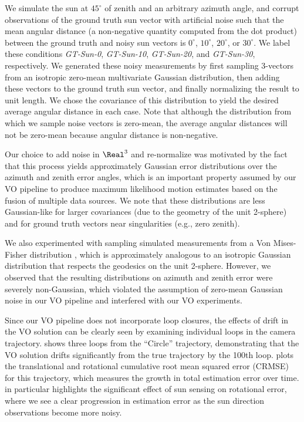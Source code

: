 We simulate the sun at $45^\circ$ of zenith and an arbitrary azimuth angle, and corrupt observations of the ground truth sun vector with artificial noise such that the mean angular distance (a non-negative quantity computed from the dot product) between the ground truth and noisy sun vectors is $0^\circ$, $10^\circ$, $20^\circ$, or $30^\circ$.
We label these conditions \emph{GT-Sun-0}, \emph{GT-Sun-10}, \emph{GT-Sun-20}, and \emph{GT-Sun-30}, respectively.
We generated these noisy measurements by first sampling \mbox{3-vectors} from an isotropic zero-mean multivariate Gaussian distribution, then adding these vectors to the ground truth sun vector, and finally normalizing the result to unit length. 
We chose the covariance of this distribution to yield the desired average angular distance in each case.
Note that although the distribution from which we sample noise vectors is zero-mean, the average angular distances will not be zero-mean because angular distance is non-negative.


Our choice to add noise in $\Real^3$ and re-normalize was motivated by the fact that this process yields approximately Gaussian error distributions over the azimuth and zenith error angles, which is an important property assumed by our VO pipeline to produce maximum likelihood motion estimates based on the fusion of multiple data sources.
We note that these distributions are less Gaussian-like for larger covariances (due to the geometry of the unit 2-sphere) and for ground truth vectors near singularities (e.g., zero zenith).

We also experimented with sampling simulated measurements from a Von Mises-Fisher distribution \citep{fisher1953dispersion}, which is approximately analogous to an isotropic Gaussian distribution that respects the geodesics on the unit 2-sphere.
However, we observed that the resulting distributions on azimuth and zenith error were severely non-Gaussian, which violated the assumption of zero-mean Gaussian noise in our VO pipeline and interfered with our VO experiments.

Since our VO pipeline does not incorporate loop closures, the effects of drift in the VO solution can be clearly seen by examining individual loops in the camera trajectory. 
 shows three loops from the ``Circle'' trajectory, demonstrating that the VO solution drifts significantly from the true trajectory by the 100th loop.
 plots the translational and rotational cumulative root mean squared error (CRMSE) for this trajectory, which measures the growth in total estimation error over time.
 in particular highlights the significant effect of sun sensing on rotational error, where we see a clear progression in estimation error as the sun direction observations become more noisy.

